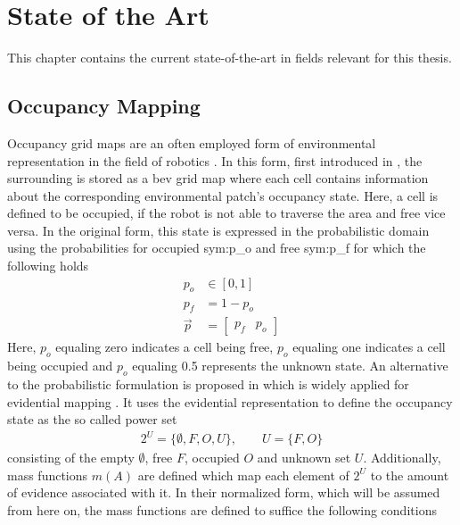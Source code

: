 
\chapter{State of the Art}
\label{ch:state_of_the_art}
This chapter contains the current state-of-the-art in fields relevant for this thesis.
%
\section{Occupancy Mapping}
\label{sec:occupancy_mapping}
Occupancy grid maps are an often employed form of environmental representation in the field of robotics \cite{carrillo2015autonomous,elfes1989using,fleuret2007multicamera}. In this form, first introduced in \cite{elfes1989using}, the surrounding is stored as a \gls{bev} grid map where each cell contains information about the corresponding environmental patch's occupancy state. Here, a cell is defined to be occupied, if the robot is not able to traverse the area and free vice versa. In the original form, this state is expressed in the probabilistic domain using the probabilities for occupied \gls{sym:p_o} and free \gls{sym:p_f} for which the following holds
\begin{align}
	p_o &\in [0,1]\\
	p_f &= 1-p_o\\
	\vec{p} &= \begin{bmatrix} p_f & p_o \end{bmatrix}
\end{align}
Here, $p_o$ equaling zero indicates a cell being free, $p_o$ equaling one indicates a cell being occupied and $p_o$ equaling 0.5 represents the unknown state. An alternative to the probabilistic formulation is proposed in \cite{pagac1996evidential} which is widely applied for evidential mapping \cite{moras2011moving,yu2015evidential,mouhagir2017using}. It uses the evidential representation \cite{dempster1968generalization,shafer1976mathematical} to define the occupancy state as the so called power set
\begin{align}
	2^{U} = \{\emptyset, F, O, U\}, \qquad U = \{F,O\}	
\end{align}
consisting of the empty $\emptyset$, free $F$, occupied $O$ and unknown set $U$. Additionally, mass functions $m(A)$ are defined which map each element of $2^{U}$ to the amount of evidence associated with it. In their normalized form, which will be assumed from here on, the mass functions are defined to suffice the following conditions
